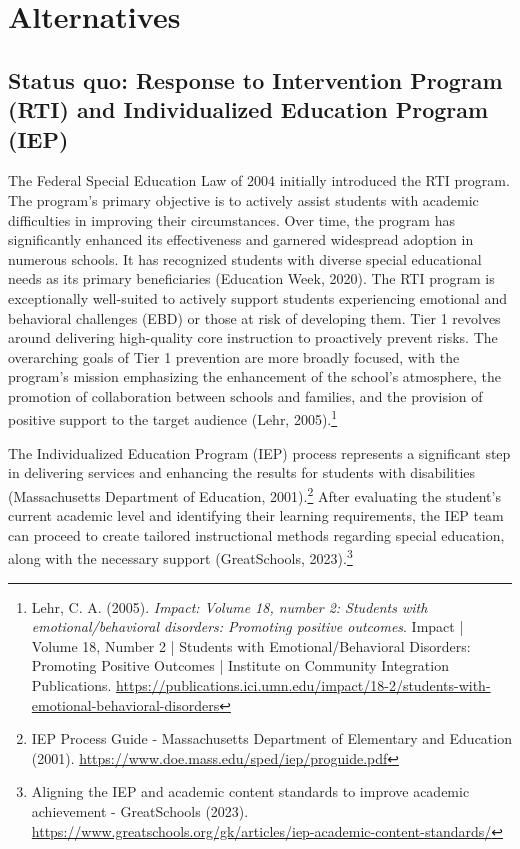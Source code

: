 \documentclass[11pt]{article}
\begin{document}
\section{Alternatives}

\subsection{Status quo: Response to Intervention Program (RTI) and Individualized Education Program (IEP)}

The Federal Special Education Law of 2004 initially introduced the RTI program. The program's primary objective is to actively assist students with academic difficulties in improving their circumstances. Over time, the program has significantly enhanced its effectiveness and garnered widespread adoption in numerous schools. It has recognized students with diverse special educational needs as its primary beneficiaries (Education Week, 2020). The RTI program is exceptionally well-suited to actively support students experiencing emotional and behavioral challenges (EBD) or those at risk of developing them. Tier 1 revolves around delivering high-quality core instruction to proactively prevent risks. The overarching goals of Tier 1 prevention are more broadly focused, with the program's mission emphasizing the enhancement of the school's atmosphere, the promotion of collaboration between schools and families, and the provision of positive support to the target audience (Lehr, 2005).\footnote{Lehr, C. A. (2005). \textit{Impact: Volume 18, number 2: Students with emotional/behavioral disorders: Promoting positive outcomes}. Impact | Volume 18, Number 2 | Students with Emotional/Behavioral Disorders: Promoting Positive Outcomes | Institute on Community Integration Publications. \url{https://publications.ici.umn.edu/impact/18-2/students-with-emotional-behavioral-disorders}}

The Individualized Education Program (IEP) process represents a significant step in delivering services and enhancing the results for students with disabilities (Massachusetts Department of Education, 2001).\footnote{IEP Process Guide - Massachusetts Department of Elementary and Education (2001). \url{https://www.doe.mass.edu/sped/iep/proguide.pdf}} After evaluating the student's current academic level and identifying their learning requirements, the IEP team can proceed to create tailored instructional methods regarding special education, along with the necessary support (GreatSchools, 2023).\footnote{Aligning the IEP and academic content standards to improve academic achievement - GreatSchools (2023). \url{https://www.greatschools.org/gk/articles/iep-academic-content-standards/}}
\end{document}

